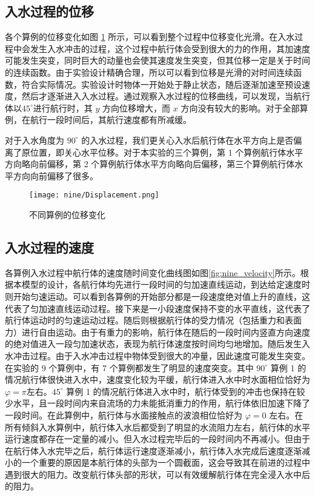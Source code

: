 \subsection{入水过程的位移}

各个算例的位移变化如图 \ref{fig:nine_displacement} 所示，可以看到整个过程中位移变化光滑。在入水过程中会发生入水冲击的过程，这个过程中航行体会受到很大的力的作用，其加速度可能发生突变，同时巨大的动量也会使其速度发生突变，但其位移一定是关于时间的连续函数。由于实验设计精确合理，所以可以看到位移是光滑的对时间连续函数，符合实际情况。实验设计时物体一开始处于静止状态，随后逐渐加速至预设速度，然后才逐渐进入入水过程。通过观察入水过程的位移曲线，可以发现，当航行体以$45^\circ$进行航行时，其 $y$ 方向位移增大，而 $x$ 方向没有较大的影响。对于全部算例，在航行一段时间后，其航行速度都有所减缓。

对于入水角度为 $90 ^\circ$ 的入水过程，我们更关心入水后航行体在水平方向上是否偏离了原位置，即关心水平位移。对于本实验的三个算例，第 1 个算例航行体水平方向略向前偏移，第 2 个算例航行体水平方向略向后偏移，第三个算例航行体水平方向向前偏移了很多。%

\begin{figure}[!htp]
  \centering 
  \texttt{[image: nine/Displacement.png]}
  \caption{不同算例的位移变化}
  \label{fig:nine_displacement}
\end{figure}

\subsection{入水过程的速度}
各算例入水过程中航行体的速度随时间变化曲线图如图\ref{fig:nine_velocity}所示。根据本模型的设计，各航行体均先进行一段时间的匀加速直线运动，到达给定速度时则开始匀速运动。可以看到各算例的开始部分都是一段速度绝对值上升的直线，这代表了匀加速直线运动过程。接下来是一小段速度保持不变的水平直线，这代表了航行体运动时的匀速运动过程。随后则根据航行体的受力情况（包括重力和表面力）进行自由运动。由于有重力的影响，航行体在随后的一段时间内竖直方向速度的绝对值进入一段匀加速状态，表现为航行体速度按时间均匀地增加。随后发生入水冲击过程。由于入水冲击过程中物体受到很大的冲量，因此速度可能发生突变。在实验的 9 个算例中，有 7 个算例都发生了明显的速度突变。其中 $90^\circ$ 算例 1 的情况航行体很快进入水中，速度变化较为平缓，航行体进入水中时水面相位恰好为 $\varphi = \pi$左右。$45 ^\circ$ 算例 1 的情况航行体进入水中时，航行体受到的冲击也保持在较少水平，且一段时间内来自流场的力未能抵消重力的作用，航行体依旧加速下降了一段时间。在此算例中，航行体与水面接触点的波浪相位恰好为 $\varphi = 0$ 左右。在所有倾斜入水算例中，航行体入水后都受到了明显的水流阻力左右，航行体的水平运行速度都存在一定量的减小。但入水过程完毕后的一段时间内不再减小。但由于在航行体入水完毕之后，航行体运行速度逐渐减小，航行体入水完成后速度逐渐减小的一个重要的原因是本航行体的头部为一个圆截面，这会导致其在前进的过程中遇到很大的阻力。改变航行体头部的形状，可以有效缓解航行体在完全浸入水中后的阻力。

